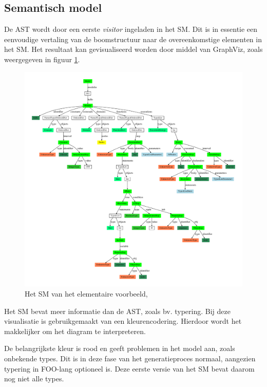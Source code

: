 
\subsection{Semantisch model}
\label{subsection:devel-semantic-model}

De AST wordt door een eerste \emph{visitor} ingeladen in het SM. Dit is in
essentie een eenvoudige vertaling van de boomstructuur naar de overeenkomstige
elementen in het SM. Het resultaat kan gevisualiseerd worden door middel van
GraphViz, zoals weergegeven in figuur \ref{fig:hello.sm}.

\begin{figure}[ht]
  \centering
  \includegraphics[width=\linewidth]{resources/hello_sm.pdf}
  \caption{Het SM van het elementaire voorbeeld, }
  \label{fig:hello.sm}
\end{figure}

Het SM bevat meer informatie dan de AST, zoals bv. typering. Bij deze
visualisatie is gebruikgemaakt van een kleurencodering. Hierdoor wordt het
makkelijker om het diagram te interpreteren.

De belangrijkste kleur is rood en geeft problemen in het model aan, zoals
onbekende types. Dit is in deze fase van het generatieproces normaal, aangezien
typering in FOO-lang optioneel is. Deze eerste versie van het SM bevat daarom
nog niet alle types.


